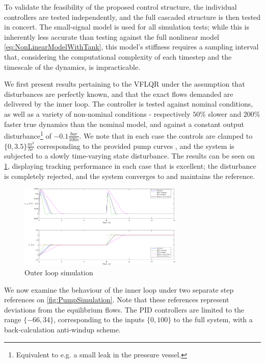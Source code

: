 To validate the feasibility of the proposed control structure, the individual controllers are tested independently, and the full cascaded structure is then tested in concert. The small-signal model is used for all simulation tests; while this is inherently less accurate than testing against the full nonlinear model \cref{eq:NonLinearModelWithTank}, this model's stiffness requires a sampling interval that, considering the computational complexity of each timestep and the timescale of the dynamics, is impracticable.

We first present results pertaining to the VFLQR under the assumption that disturbances are perfectly known, and that the exact flows demanded are delivered by the inner loop. The controller is tested against nominal conditions, as well as a variety of non-nominal conditions - respectively $50\%$ slower and $200\%$ faster true dynamics than the nominal model, and against a constant output disturbance\footnote{Equivalent to e.g. a small leak in the pressure vessel.} of $-0.1 \frac{\si{bar}}{100\si{s}}$. We note that in each case the controls are clamped to $\{0, 3.5\} \frac{\si{m^3}}{\si{hr}}$ corresponding to the provided pump curves \cite{GrundfosDatablad}, and the system is subjected to a slowly time-varying state disturbance. The results can be seen on \cref{fig:LQRTracking}, displaying tracking performance in each case that is excellent; the disturbance is completely rejected, and the system converges to and maintains the reference. 


\begin{figure}[h!]
	\includegraphics[height=4cm, width=\linewidth]{Graphics/LQRTracking.pdf}
	\caption{Outer loop simulation}
	\label{fig:LQRTracking}
\end{figure}

 We now examine the behaviour of the inner loop under two separate step references on \cref{fig:PumpSimulation}. Note that these references represent deviations from the equilibrium flows. The PID controllers are limited to the range $\{-66,34\}$, corresponding to the inputs $\{0,100\}$ to the full system, with a back-calculation anti-windup scheme.

